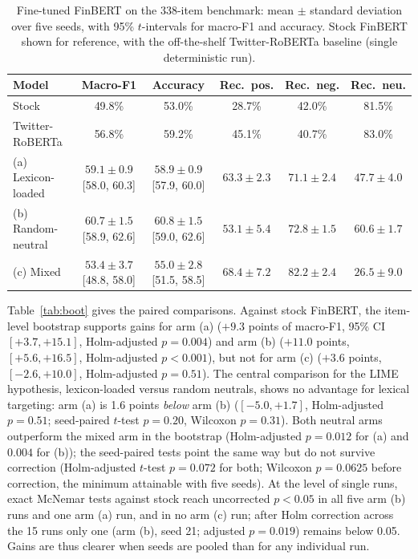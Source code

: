 \documentclass{aims}
\numberwithin{equation}{section}
\begin{document}
\begin{table}[ht]
\centering
\caption{Fine-tuned FinBERT on the 338-item benchmark: mean $\pm$ standard deviation
over five seeds, with 95\% $t$-intervals for macro-F1 and accuracy. Stock FinBERT
shown for reference, with the off-the-shelf Twitter-RoBERTa baseline (single
deterministic run).}
\label{tab:armres}
\small
\begin{tabular}{lccccc}
\toprule
\textbf{Model} & \textbf{Macro-F1} & \textbf{Accuracy} & \textbf{Rec.\ pos.} & \textbf{Rec.\ neg.} & \textbf{Rec.\ neu.} \\
\midrule
Stock & 49.8\% & 53.0\% & 28.7\% & 42.0\% & 81.5\% \\
Twitter-RoBERTa & 56.8\% & 59.2\% & 45.1\% & 40.7\% & 83.0\% \\
(a) Lexicon-loaded & $59.1 \pm 0.9$ [58.0, 60.3] & $58.9 \pm 0.9$ [57.9, 60.0] & $63.3 \pm 2.3$ & $71.1 \pm 2.4$ & $47.7 \pm 4.0$ \\
(b) Random-neutral & $60.7 \pm 1.5$ [58.9, 62.6] & $60.8 \pm 1.5$ [59.0, 62.6] & $53.1 \pm 5.4$ & $72.8 \pm 1.5$ & $60.6 \pm 1.7$ \\
(c) Mixed & $53.4 \pm 3.7$ [48.8, 58.0] & $55.0 \pm 2.8$ [51.5, 58.5] & $68.4 \pm 7.2$ & $82.2 \pm 2.4$ & $26.5 \pm 9.0$ \\
\bottomrule
\end{tabular}
\end{table}

Table~\ref{tab:boot} gives the paired comparisons. Against stock FinBERT, the
item-level bootstrap supports gains for arm (a) ($+9.3$ points of macro-F1, 95\% CI
$[+3.7, +15.1]$, Holm-adjusted $p = 0.004$) and arm (b) ($+11.0$ points,
$[+5.6, +16.5]$, Holm-adjusted $p < 0.001$), but not for arm (c) ($+3.6$ points,
$[-2.6, +10.0]$, Holm-adjusted $p = 0.51$). The central comparison for the LIME
hypothesis, lexicon-loaded versus random neutrals, shows no advantage for lexical
targeting: arm (a) is 1.6 points \emph{below} arm (b) ($[-5.0, +1.7]$,
Holm-adjusted $p = 0.51$; seed-paired $t$-test $p = 0.20$, Wilcoxon $p = 0.31$). Both
neutral arms outperform the mixed arm in the bootstrap (Holm-adjusted $p = 0.012$
for (a) and $0.004$ for (b)); the seed-paired tests point the same way but do not
survive correction (Holm-adjusted $t$-test $p = 0.072$ for both; Wilcoxon $p = 0.0625$
before correction, the minimum attainable with five seeds). At the level of single
runs, exact McNemar tests against stock reach uncorrected $p < 0.05$ in all five arm
(b) runs and one arm (a) run, and in no arm (c) run; after Holm correction across the
15 runs only one (arm (b), seed 21; adjusted $p = 0.019$) remains below 0.05. Gains
are thus clearer when seeds are pooled than for any individual run.
\end{document}
